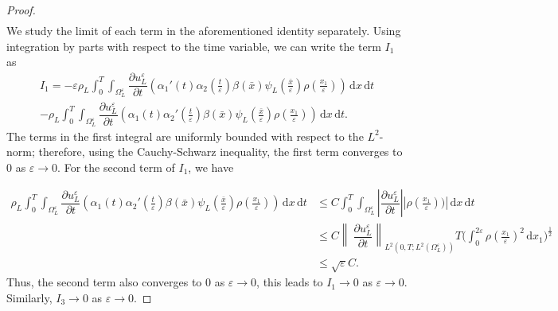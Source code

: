 \documentclass[10pt,a4paper]{amsart}
\newcommand{\di}[1]{\,\mathrm{d}#1}
\def\es{\varepsilon}
\def\oll{\Omega_L^\varepsilon}
\begin{document}
\begin{proof}
\begin{multline}
\end{multline}
We study the limit of each term in the aforementioned identity separately.
Using integration by parts with respect to the time variable, we can write the term $ I_1$ as
\begin{multline*} 
    I_1=-\es \rho_L\int_0^T\int_{\oll}  \dfrac{\partial u_L^\es}{\partial t} (\alpha_1'(t)\alpha_2(\frac{t}{\es})\beta(\bar x) \psi_L(\frac{\bar x}{\es})\rho(\frac{x_1}{\es}))\di{x}\di{t}\\
    -\rho_L\int_0^T\int_{\oll}  \dfrac{\partial u_L^\es}{\partial t} (\alpha_1(t)\alpha_2'(\frac{t}{\es})\beta(\bar x) \psi_L(\frac{\bar x}{\es})\rho(\frac{x_1}{\es}))\di{x}\di{t}.
\end{multline*}
The terms in the first integral are uniformly bounded with respect to the $L^2$-norm; therefore, using the Cauchy-Schwarz inequality, the first term converges to $0$ as $\es\rightarrow0$. 
%
For the second term of $I_1$, we have 

\begin{align*}
    \rho_L\int_0^T\int_{\oll}  \dfrac{\partial u_L^\es}{\partial t} (\alpha_1(t)\alpha_2'(\frac{t}{\es})\beta(\bar x) \psi_L(\frac{\bar x}{\es})\rho(\frac{x_1}{\es}))\di{x}\di{t}&\leq C \int_0^T\int_{\oll} \left| \dfrac{\partial u_L^\es}{\partial t}\right| |\rho(\frac{x_1}{\es}))| \di{x}\di{t}\\
    &\leq C  \left\|\ \dfrac{\partial u_L^\es}{\partial t}\right\|_{L^{2}(0,T;L^2(\oll))}T\Big(\int_0^{2\es}\rho(\frac{x_1}{\es})^2\di{x_1}\Big)^{\frac{1}{2}}\\
    &\leq \sqrt{\es} C.
\end{align*}
Thus, the second term also converges to $0$ as $\es\rightarrow 0$, this leads to $I_1\rightarrow0 $ as $\es\rightarrow 0$. Similarly, $I_3\rightarrow0 $ as $\es\rightarrow 0$.


\end{proof}
\end{document}
